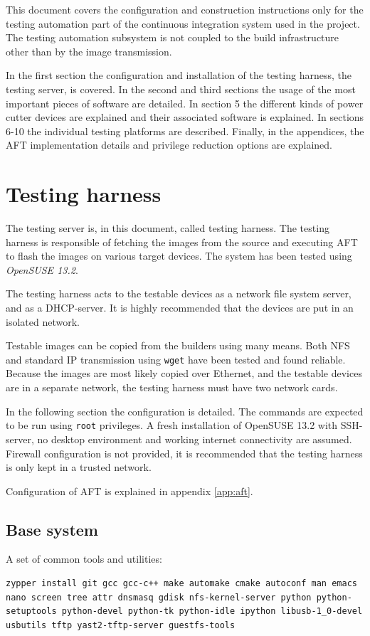 \documentclass[a4paper,11pt]{article}
\newcommand{\cmd}[1]{\texttt{#1}}
\begin{document}
This document covers the configuration and construction instructions only for the testing automation part of the continuous integration system used in the project. The testing automation subsystem is not coupled to the build infrastructure other than by the image transmission.

In the first section the configuration and installation of the testing harness, the testing server, is covered. In the second and third sections the usage of the most important pieces of software are detailed. In section 5 the different kinds of power cutter devices are explained and their associated software is explained. In sections 6-10 the individual testing platforms are described. Finally, in the appendices, the AFT implementation details and privilege reduction options are explained.

\section{Testing harness}
\label{testingharness}
The testing server is, in this document, called testing harness. The testing harness is responsible of fetching the images from the source and executing AFT to flash the images on various target devices. The system has been tested using \emph{OpenSUSE 13.2}.

The testing harness acts to the testable devices as a network file system server, and as a DHCP-server. It is highly recommended that the devices are put in an isolated network.

Testable images can be copied from the builders using many means. Both NFS and standard IP transmission using \cmd{wget} have been tested and found reliable. Because the images are most likely copied over Ethernet, and the testable devices are in a separate network, the testing harness must have two network cards.

In the following section the configuration is detailed. The commands are expected to be run using \cmd{root} privileges. A fresh installation of OpenSUSE 13.2 with SSH-server, no desktop environment and working internet connectivity are assumed. Firewall configuration is not provided, it is recommended that the testing harness is only kept in a trusted network.

Configuration of AFT is explained in appendix \ref{app:aft}.

\subsection*{Base system}
A set of common tools and utilities:
\begin{lstlisting}
zypper install git gcc gcc-c++ make automake cmake autoconf man emacs nano screen tree attr dnsmasq gdisk nfs-kernel-server python python-setuptools python-devel python-tk python-idle ipython libusb-1_0-devel usbutils tftp yast2-tftp-server guestfs-tools
\end{lstlisting}
\end{document}
